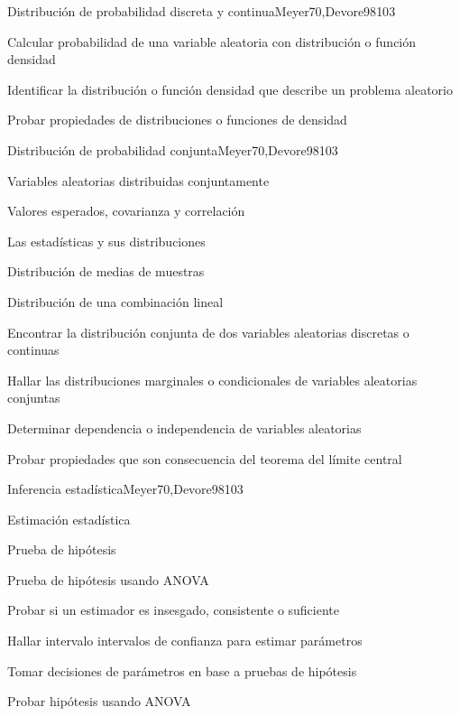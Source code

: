 \begin{syllabus}
\begin{unit}{Distribución de probabilidad discreta y continua}{}{Meyer70,Devore98}{10}{3}
   \begin{learningoutcomes}
      \item Calcular probabilidad de una variable aleatoria con distribución o función densidad
      \item Identificar la distribución o función densidad que describe un problema aleatorio
      \item Probar propiedades de distribuciones o funciones de densidad
   \end{learningoutcomes}
\end{unit}

\begin{unit}{Distribución de probabilidad conjunta}{}{Meyer70,Devore98}{10}{3}
\begin{topics}
      \item Variables aleatorias distribuidas conjuntamente
      \item Valores esperados, covarianza y correlación
      \item Las estadísticas y sus distribuciones
      \item Distribución de medias de muestras
      \item Distribución de una combinación lineal

   \end{topics}
   \begin{learningoutcomes}
      \item Encontrar la distribución conjunta de dos variables aleatorias discretas o continuas
      \item Hallar las distribuciones marginales o condicionales de variables aleatorias conjuntas
      \item Determinar dependencia o independencia de variables aleatorias
      \item Probar propiedades que son consecuencia del teorema  del límite central
   \end{learningoutcomes}
\end{unit}

\begin{unit}{Inferencia estadística}{}{Meyer70,Devore98}{10}{3}
\begin{topics}
      \item Estimación estadística
      \item Prueba de hipótesis
      \item Prueba de hipótesis usando ANOVA
   \end{topics}

   \begin{learningoutcomes}
      \item Probar si un estimador es insesgado, consistente o suficiente
      \item Hallar intervalo intervalos de confianza para estimar parámetros
      \item Tomar decisiones de parámetros en base a pruebas de hipótesis
      \item Probar hipótesis usando ANOVA
   \end{learningoutcomes}
\end{unit}




\end{syllabus}
